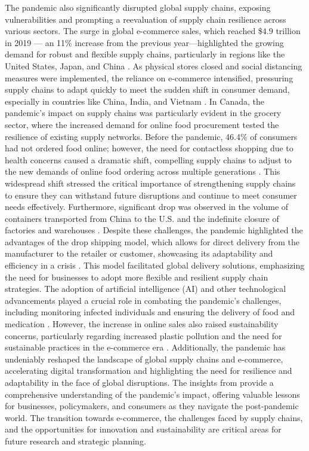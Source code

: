 The pandemic also significantly disrupted global supply chains, exposing vulnerabilities and prompting a reevaluation of supply chain resilience across various sectors. The surge in global e-commerce sales, which reached \$$4.9$ trillion in 2019 — an 11\% increase from the previous year—highlighted the growing demand for robust and flexible supply chains, particularly in regions like the United States, Japan, and China \parencite{KofiMensah2021Cross-BorderReview}. As physical stores closed and social distancing measures were implemented, the reliance on e-commerce intensified, pressuring supply chains to adapt quickly to meet the sudden shift in consumer demand, especially in countries like China, India, and Vietnam \parencite{KofiMensah2021Cross-BorderReview}. In Canada, the pandemic's impact on supply chains was particularly evident in the grocery sector, where the increased demand for online food procurement tested the resilience of existing supply networks. Before the pandemic, 46.4\% of consumers had not ordered food online; however, the need for contactless shopping due to health concerns caused a dramatic shift, compelling supply chains to adjust to the new demands of online food ordering across multiple generations \parencite{Charlebois2021SupplyStudy}. This widespread shift stressed the critical importance of strengthening supply chains to ensure they can withstand future disruptions and continue to meet consumer needs effectively. Furthermore, significant drop was observed in the volume of containers transported from China to the U.S. and the indefinite closure of factories and warehouses \parencite{Miljenovic2022PandemicsPandemic}. Despite these challenges, the pandemic highlighted the advantages of the drop shipping model, which allows for direct delivery from the manufacturer to the retailer or customer, showcasing its adaptability and efficiency in a crisis \parencite{Miljenovic2022PandemicsPandemic}. This model facilitated global delivery solutions, emphasizing the need for businesses to adopt more flexible and resilient supply chain strategies. The adoption of artificial intelligence (AI) and other technological advancements played a crucial role in combating the pandemic's challenges, including monitoring infected individuals and ensuring the delivery of food and medication \parencite{KofiMensah2021Cross-BorderReview}. However, the increase in online sales also raised sustainability concerns, particularly regarding increased plastic pollution and the need for sustainable practices in the e-commerce era \parencite{Charlebois2021SupplyStudy}. Additionally, the pandemic has undeniably reshaped the landscape of global supply chains and e-commerce, accelerating digital transformation and highlighting the need for resilience and adaptability in the face of global disruptions. The insights from \textcite{Charlebois2021SupplyStudy, Miljenovic2022PandemicsPandemic, Din2022ThePurchasing, KofiMensah2021Cross-BorderReview} provide a comprehensive understanding of the pandemic's impact, offering valuable lessons for businesses, policymakers, and consumers as they navigate the post-pandemic world. The transition towards e-commerce, the challenges faced by supply chains, and the opportunities for innovation and sustainability are critical areas for future research and strategic planning.

